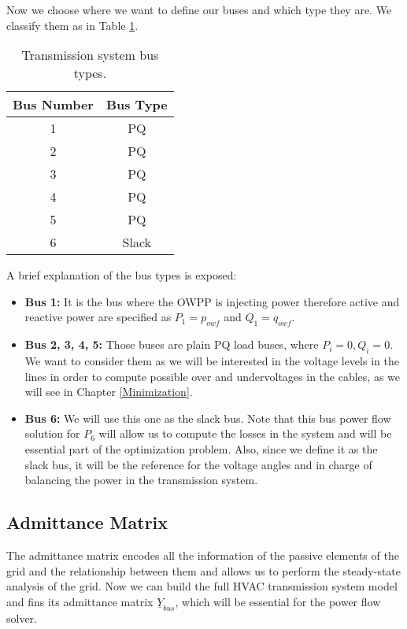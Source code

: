 \documentclass[a4paper,11pt, titlepage, twoside]{article}
\begin{document}
Now we choose where we want to define our buses and which type they are. We classify them as in Table \ref{table:bus_types}.
\begin{table}[h]
\centering
\begin{tabular}{c|c}
\hline
\textbf{Bus Number} & \textbf{Bus Type} \\
\hline
1 & PQ \\
2 & PQ \\
3 & PQ \\
4 & PQ \\
5 & PQ \\
6 & Slack \\
\hline
\end{tabular}
\caption{Transmission system bus types.}
\label{table:bus_types}
\end{table}

A brief explanation of the bus types is exposed:
\begin{itemize}
    \item \textbf{Bus 1:} It is the bus where the OWPP is injecting power therefore active and reactive power are specified as $P_1=p_{owf}$ and $Q_1=q_{owf}$.
    \item \textbf{Bus 2, 3, 4, 5:} Those buses are plain  PQ load buses, where $P_i=0, Q_i=0$. We want to consider them as we will be interested in the voltage levels in the lines in order
    to compute possible over and undervoltages in the cables, as we will see in Chapter \ref{Minimization}.
    \item \textbf{Bus 6:} We will use this one as the slack bus. Note that this bus power flow solution for $P_6$ will allow us to compute the losses in the system
    and will be essential part of the optimization problem. Also, since we define it as the slack bus, it will be the reference for the voltage angles and in charge of balancing the power in the transmission system. 
\end{itemize}
\subsection{Admittance Matrix}

The admittance matrix encodes all the information of the passive elements of the grid and the relationship between them and allows us to perform the steady-state 
analysis of the grid.
Now we can build the full HVAC transmission system model and fins its admittance matrix $\underline{Y}_{bus}$, which will be essential
for the power flow solver.
\end{document}
